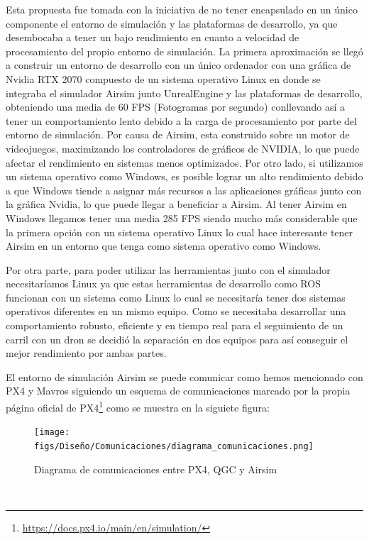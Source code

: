 Esta propuesta fue tomada con la iniciativa de no tener encapsulado en un único componente el entorno de simulación y las plataformas de desarrollo, ya que desembocaba a tener un 
bajo rendimiento en cuanto a velocidad de procesamiento del propio entorno de simulación. La primera aproximación se llegó a construir un entorno de desarrollo con un único ordenador con una gráfica
de Nvidia RTX 2070 compuesto de un sistema operativo Linux en donde se integraba el simulador Airsim junto UnrealEngine y las plataformas de desarrollo, obteniendo una media de 60 FPS (Fotogramas por segundo)
conllevando así a tener un comportamiento lento debido a la carga de procesamiento por parte del entorno de simulación. Por causa de Airsim, esta construido sobre un motor de videojuegos, maximizando los controladores
de gráficos de NVIDIA, lo que puede afectar el rendimiento en sistemas menos optimizados. Por otro lado, si utilizamos un sistema operativo como Windows, es posible lograr un alto rendimiento debido a que Windows
tiende a asignar más recursos a las aplicaciones gráficas junto con la gráfica Nvidia, lo que puede llegar a beneficiar a Airsim. Al tener Airsim en Windows llegamos tener una media 285 FPS siendo
mucho más considerable que la primera opción con un sistema operativo Linux lo cual hace interesante tener Airsim en un entorno que tenga como sistema operativo como Windows. \newline

Por otra parte, para poder utilizar las herramientas junto con el simulador necesitaríamos Linux ya que estas herramientas de desarrollo como ROS funcionan con un sistema como Linux lo cual se necesitaría 
tener dos sistemas operativos diferentes en un mismo equipo. Como se necesitaba desarrollar una comportamiento robusto, eficiente y en tiempo real para el seguimiento de un carril con un dron se decidió
la separación en dos equipos para así conseguir el mejor rendimiento por ambas partes. \newline

El entorno de simulación Airsim se puede comunicar como hemos mencionado con PX4 y Mavros siguiendo un esquema de comunicaciones marcado por la propia página oficial de 
PX4\footnote{\url{https://docs.px4.io/main/en/simulation/}} como se muestra en la siguiete figura:

\begin{figure} [H]
  \begin{center}
    \texttt{[image: figs/Diseño/Comunicaciones/diagrama\_comunicaciones.png]}
  \end{center}
  \caption{Diagrama de comunicaciones entre PX4, QGC y Airsim}
  \label{fig:diagramapx4}
\end{figure}\

